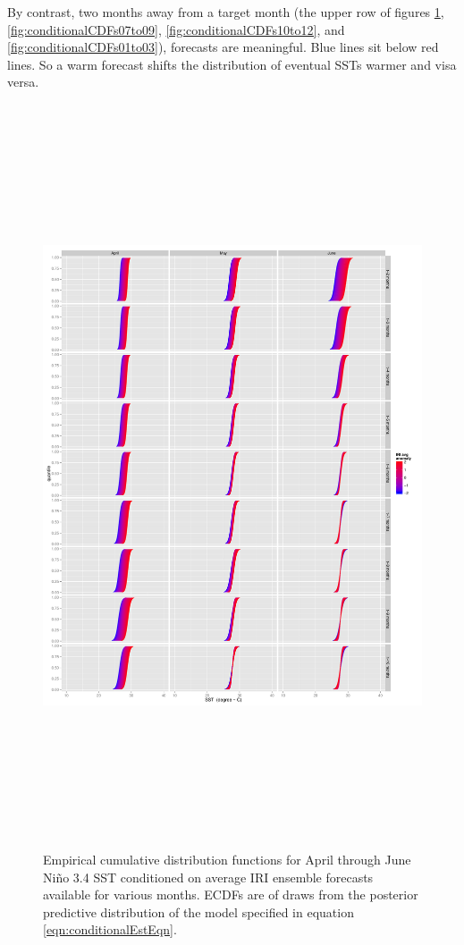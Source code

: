 \documentclass[authoryear]{article}
\begin{document}
By contrast, two months away from a target month (the upper row of figures \ref{fig:conditionalCDFs04to06}, \ref{fig:conditionalCDFs07to09}, \ref{fig:conditionalCDFs10to12}, and \ref{fig:conditionalCDFs01to03}), forecasts are meaningful. Blue lines sit below red lines. So a warm forecast shifts the distribution of eventual SSTs warmer and visa versa.

\begin{figure}[!htbp]
\begin{center}
  \includegraphics[height=22cm, keepaspectratio]{Pricingfigs/conditionalCDFs04to06TraditionalCDFconfig}
  \caption{Empirical cumulative distribution functions for April through June Ni\~no 3.4 SST conditioned on average IRI ensemble forecasts available for various months. ECDFs are of draws from the posterior predictive distribution of the model specified in equation \ref{eqn:conditionalEstEqn}.}
   \label{fig:conditionalCDFs04to06}
   \end{center}
\end{figure}
\end{document}
